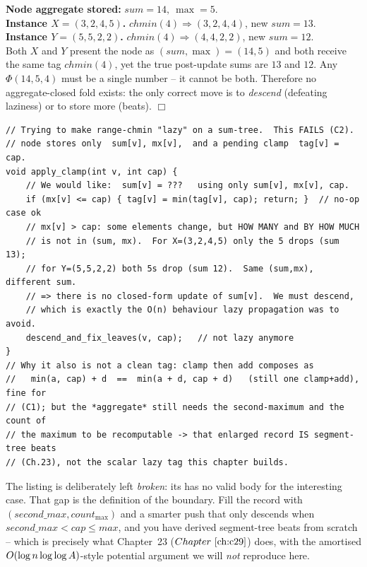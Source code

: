 \begin{tracebox}
\textbf{Node aggregate stored:} \(\mathit{sum}=14,\ \max=5\).\\[2pt]
\textbf{Instance \(X=(3,2,4,5)\).} \(\mathit{chmin}(4)\Rightarrow(3,2,4,4)\), new \(\mathit{sum}=13\).\\
\textbf{Instance \(Y=(5,5,2,2)\).} \(\mathit{chmin}(4)\Rightarrow(4,4,2,2)\), new \(\mathit{sum}=12\).\\[2pt]
Both \(X\) and \(Y\) present the node as \((\mathit{sum},\max)=(14,5)\) and both receive the same tag \(\mathit{chmin}(4)\), yet the true post-update sums are \(13\) and \(12\).  Any \(\Phi(14,5,4)\) must be a single number -- it cannot be both.  Therefore no aggregate-closed fold exists: the only correct move is to \emph{descend} (defeating laziness) or to store more (beats).  \(\Box\)
\end{tracebox}

\begin{lstlisting}[caption={the tempting-but-broken attempt: a scalar min-tag cannot fold the sum, so apply() is forced to descend}, label={lst:c15-nocompose}]
// Trying to make range-chmin "lazy" on a sum-tree.  This FAILS (C2).
// node stores only  sum[v], mx[v],  and a pending clamp  tag[v] = cap.
void apply_clamp(int v, int cap) {
    // We would like:  sum[v] = ???   using only sum[v], mx[v], cap.
    if (mx[v] <= cap) { tag[v] = min(tag[v], cap); return; }  // no-op case ok
    // mx[v] > cap: some elements change, but HOW MANY and BY HOW MUCH
    // is not in (sum, mx).  For X=(3,2,4,5) only the 5 drops (sum 13);
    // for Y=(5,5,2,2) both 5s drop (sum 12).  Same (sum,mx), different sum.
    // => there is no closed-form update of sum[v].  We must descend,
    // which is exactly the O(n) behaviour lazy propagation was to avoid.
    descend_and_fix_leaves(v, cap);   // not lazy anymore
}
// Why it also is not a clean tag: clamp then add composes as
//   min(a, cap) + d  ==  min(a + d, cap + d)   (still one clamp+add), fine for
// (C1); but the *aggregate* still needs the second-maximum and the count of
// the maximum to be recomputable -> that enlarged record IS segment-tree beats
// (Ch.23), not the scalar lazy tag this chapter builds.
\end{lstlisting}

\noindent The listing is deliberately left \emph{broken}: its  has no valid body for the interesting case.  That gap is the definition of the boundary.  Fill the record with \((\mathit{second\_max},\mathit{count}_{\max})\) and a smarter push that only descends when \(\mathit{second\_max}<\mathit{cap}\le\mathit{max}\), and you have derived segment-tree beats from scratch -- which is precisely what Chapter~23 (\(\chref{c29}\)) does, with the amortised \(O(\log n\log\log A)\)-style potential argument we will \emph{not} reproduce here.

